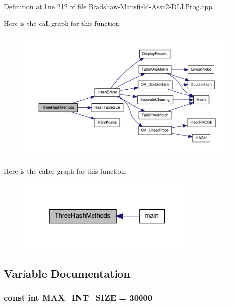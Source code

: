 Definition at line 212 of file Bradshaw-\/Mansfield-\/Assn2-\/DLLProg.cpp.



Here is the call graph for this function:
\nopagebreak
\begin{figure}[H]
\begin{center}
\leavevmode
\includegraphics[width=400pt]{_bradshaw-_mansfield-_assn2-_d_l_l_prog_8cpp_ac4885dc21b261220f2a030b1ad06aec5_cgraph}
\end{center}
\end{figure}




Here is the caller graph for this function:
\nopagebreak
\begin{figure}[H]
\begin{center}
\leavevmode
\includegraphics[width=256pt]{_bradshaw-_mansfield-_assn2-_d_l_l_prog_8cpp_ac4885dc21b261220f2a030b1ad06aec5_icgraph}
\end{center}
\end{figure}




\subsection{Variable Documentation}
\hypertarget{_bradshaw-_mansfield-_assn2-_d_l_l_prog_8cpp_a80697a51c12117a5eae4ada58d27e1c2}{
\subsubsection[{MAX\_\-INT\_\-SIZE}]{\setlength{\rightskip}{0pt plus 5cm}const int {\bf MAX\_\-INT\_\-SIZE} = 30000}}
\label{_bradshaw-_mansfield-_assn2-_d_l_l_prog_8cpp_a80697a51c12117a5eae4ada58d27e1c2}


